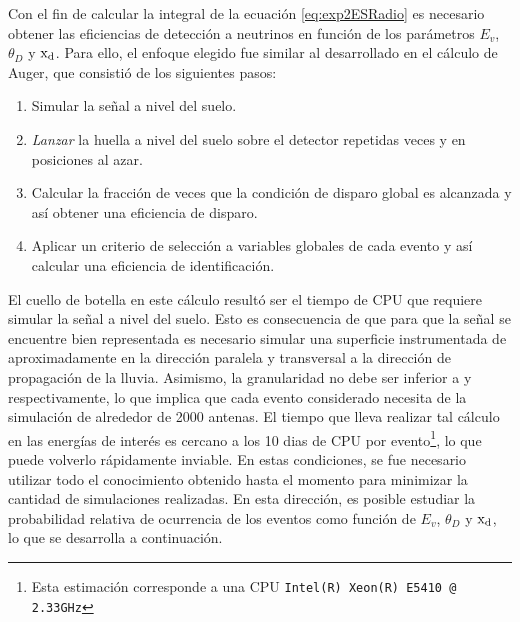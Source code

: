 Con el fin de calcular la integral de la ecuaci\'on \ref{eq:exp2ESRadio} es necesario obtener las eficiencias de detecci\'on a neutrinos en funci\'on de los par\'ametros $E_v$, $\theta_D$ y ${\rm x_d}$. 
Para ello, el enfoque elegido fue similar al desarrollado en el c\'alculo de Auger, que consisti\'o de los siguientes pasos:
%
\begin{enumerate}
	\item Simular la se\~nal a nivel del suelo.
	\item \emph{Lanzar} la huella a nivel del suelo sobre el detector repetidas veces y en posiciones al azar.
	\item Calcular la fracci\'on de veces que la condici\'on de disparo global es alcanzada y as\'i obtener una eficiencia de disparo.
	\item Aplicar un criterio de selecci\'on a variables globales de cada evento y as\'i calcular una eficiencia de identificaci\'on.
\end{enumerate}
%

El cuello de botella en este c\'alculo result\'o ser el tiempo de CPU que requiere simular la se\~nal a nivel del suelo.
Esto es consecuencia de que para que la se\~nal se encuentre bien representada es necesario simular una superficie instrumentada de aproximadamente  en la direcci\'on paralela y transversal a la direcci\'on de propagaci\'on de la lluvia.
Asimismo, la granularidad no debe ser inferior a  y  respectivamente, lo que implica que cada evento considerado necesita de la simulaci\'on de alrededor de 2000 antenas.
El tiempo que lleva realizar tal c\'alculo en las energ\'ias de inter\'es es cercano a los 10 dias de CPU por evento\footnote{Esta estimaci\'on corresponde a una CPU \texttt{Intel(R) Xeon(R) E5410 @ 2.33GHz}}, lo que puede volverlo r\'apidamente inviable.
En estas condiciones, se fue necesario utilizar todo el conocimiento obtenido hasta el momento para minimizar la cantidad de simulaciones realizadas.
En esta direcci\'on, es posible estudiar la probabilidad relativa de ocurrencia de los eventos como funci\'on de $E_v$, $\theta_D$ y ${\rm x_d}$, lo que se desarrolla a continuaci\'on.
	
